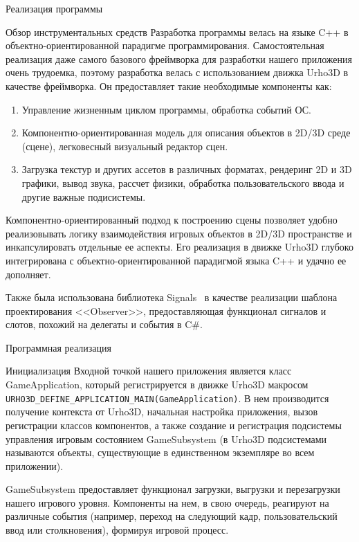 \documentclass[12pt, a4paper]{article}
\begin{document}
	\begin{section}{Реализация программы}
		\begin{subsection}{Обзор инструментальных средств}
			Разработка программы велась на языке C++ в объектно-ориентированной парадигме программирования.
			Самостоятельная реализация даже самого базового фреймворка для разработки нашего приложения очень трудоемка, поэтому разработка велась с использованием движка Urho3D в качестве фреймворка.
			Он предоставляет такие необходимые компоненты как:
			\begin{enumerate}
				\item Управление жизненным циклом программы, обработка событий ОС.
				\item Компонентно-ориентированная модель для описания объектов в 2D/3D среде (сцене), легковесный визуальный редактор сцен.
				\item Загрузка текстур и других ассетов в различных форматах, рендеринг 2D и 3D графики, вывод звука, рассчет физики, обработка пользовательского ввода и другие важные подисистемы.
			\end{enumerate}

			Компонентно-ориентированный подход к построению сцены позволяет удобно реализовывать логику взаимодействия игровых объектов в 2D/3D пространстве и инкапсулировать отдельные ее аспекты.
			Его реализация в движке Urho3D глубоко интегрирована с объектно-ориентированной парадигмой языка C++ и удачно ее дополняет.

			Также была использована библиотека Signals~\cite{signals} в качестве реализации шаблона проектирования <<Observer>>, предоставляющая функционал сигналов и слотов, похожий на делегаты и события в C#.
		\end{subsection}

		\begin{subsection}{Программная реализация}
			\begin{subsubsection}{Инициализация}
				Входной точкой нашего приложения является класс GameApplication, который регистрируется в движке Urho3D макросом \verb|URHO3D_DEFINE_APPLICATION_MAIN(GameApplication)|.
				В нем производится получение контекста от Urho3D, начальная настройка приложения, вызов регистрации классов компонентов, а также создание и регистрация подсистемы управления игровым состоянием GameSubsystem (в Urho3D подсистемами называются объекты, существующие в единственном экземпляре во всем приложении).

				GameSubsystem предоставляет функционал загрузки, выгрузки и перезагрузки нашего игрового уровня.
				Компоненты на нем, в свою очередь, реагируют на различные события (например, переход на следующий кадр, пользовательский ввод или столкновения), формируя игровой процесс.
			\end{subsubsection}


\end{subsection}
\end{section}
\end{document}
